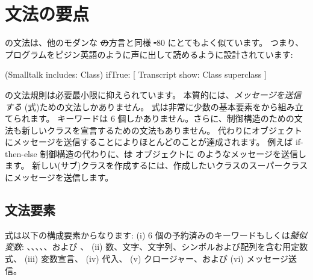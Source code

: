 \documentclass[a4paper,10pt,twoside]{book}
\begin{document}
	\renewcommand{\nnbb}[2]{} %
	\sloppy
\fi
\chapter{文法の要点}



\pharo の文法は、他のモダンな \st の方言と同様 \st-80 にとてもよく似ています。
つまり、プログラムをピジン英語のように声に出して読めるように設計されています:

\begin{code}{}
(Smalltalk includes: Class) ifTrue: [ Transcript show: Class superclass ]
\end{code}

\noindent
\pharo の文法規則は必要最小限に抑えられています。
本質的には、\emph{メッセージを送信する} (\ie 式)ための文法しかありません。
式は非常に少数の基本要素をから組み立てられます。
キーワードは 6 個しかありません。さらに、制御構造のための文法も新しいクラスを宣言するための文法もありません。
代わりにオブジェクトにメッセージを送信することによりほとんどのことが達成されます。
例えば if-then-else 制御構造の代わりに、\st は  オブジェクトに  のようなメッセージを送信します。
新しい\mbox{(サブ)クラス}を作成するには、作成したいクラスのスーパークラスにメッセージを送信します。

\section{文法要素}

式は以下の構成要素からなります:
(i) 6 個の予約済みのキーワードもしくは\emph{擬似変数}:
、、、、、および 、
(ii) 数、文字、文字列、シンボルおよび配列を含む用定数式、
(iii) 変数宣言、
(iv) 代入、
(v) クロージャー、および
(vi) メッセージ送信。
\end{document}
